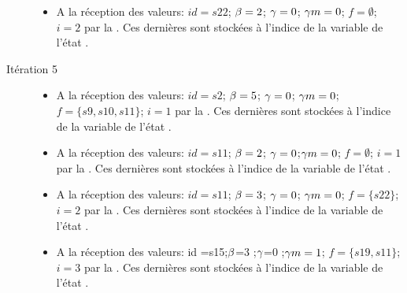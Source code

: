 \begin{Exemple}
\begin{description}
\begin{itemize}
			\item  A la réception des valeurs: $id =s22$; $\beta{}=2$; $\gamma{}=0$; $\gamma m{}=0$; $f =\emptyset$; $i=2$ par la \mtwo{}. Ces dernières sont stockées à l'indice  de la variable   de l'état .
			\end{itemize}
			\item[Itération 5]
		\begin{itemize}
		\item  A la réception des valeurs: $id =s2$; $\beta{}=5$; $\gamma{}=0$; $\gamma m{}=0$; $f =\{s9,s10,s11\}$; $i=1$ par la \mtree{}. Ces dernières sont stockées à l'indice  de la variable   de l'état .
			\item  A la réception des valeurs: $id =s11$; $\beta{}=2$; $\gamma{}=0$;$\gamma m{}=0$; $f =\emptyset$; $i=1$ par la \mtwo{}. Ces dernières sont stockées à l'indice  de la variable   de l'état .
			\item  A la réception des valeurs: $id =s11$; $\beta{}=3$; $\gamma{}=0$; $\gamma m{}=0$; $f =\{s22\}$; $i=2$ par la \mtwo{}. Ces dernières sont stockées à l'indice  de la variable   de l'état .
			\item A la réception des valeurs: id =s15;$\beta{}$=3 ;$\gamma{}$=0 ;$\gamma m{}=1$; $f =\{s19,s11\}$; $i=3$	 par la \mtwo{}. Ces dernières sont stockées à l'indice  de la variable   de l'état .
			\end{itemize}	
	\end{description}
\end{Exemple}
